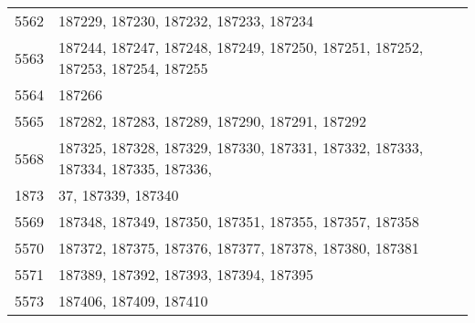 \begin{table}[!tbp]
\begin{center}
\begin{tabular}{ll}
5562 &  187229, 187230, 187232, 187233, 187234\\
5563 &  187244, 187247, 187248, 187249, 187250, 187251, 187252, 187253, 187254, 187255\\
5564 &  187266\\
5565 &  187282, 187283, 187289, 187290, 187291, 187292\\
5568 &  187325, 187328, 187329, 187330, 187331, 187332, 187333, 187334, 187335, 187336,\\
1873 & 37, 187339, 187340\\
5569 &  187348, 187349, 187350, 187351, 187355, 187357, 187358\\
5570 &  187372, 187375, 187376, 187377, 187378, 187380, 187381\\
5571 &  187389, 187392, 187393, 187394, 187395\\
5573 &  187406, 187409, 187410\\
\hline
\end{tabular}
\end{center}
\label{GoodRun}
\end{table}

